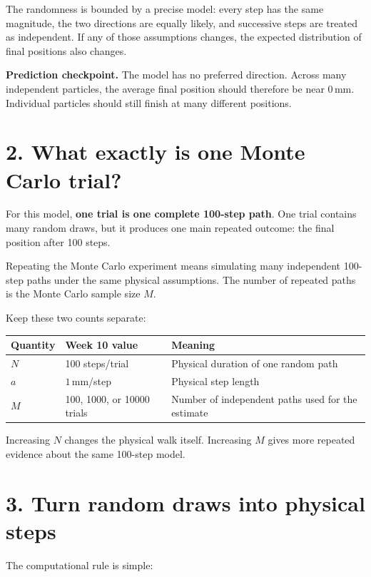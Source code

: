 \documentclass[11pt,a4paper]{article}
\newcommand{\units}[1]{\,\mathrm{#1}}
\begin{document}
The randomness is bounded by a precise model: every step has the same magnitude, the two directions are equally likely, and successive steps are treated as independent. If any of those assumptions changes, the expected distribution of final positions also changes.

\begin{checkbox}\textbf{Prediction checkpoint.} The model has no preferred direction. Across many independent particles, the average final position should therefore be near $0\units{mm}$. Individual particles should still finish at many different positions.\end{checkbox}

\section*{2. What exactly is one Monte Carlo trial?}
For this model, \textbf{one trial is one complete 100-step path}. One trial contains many random draws, but it produces one main repeated outcome: the final position after 100 steps.

Repeating the Monte Carlo experiment means simulating many independent 100-step paths under the same physical assumptions. The number of repeated paths is the Monte Carlo sample size $M$.

Keep these two counts separate:

\begin{center}\small
\begin{tabular}{p{.25\linewidth}p{.27\linewidth}p{.37\linewidth}}
\toprule
Quantity & Week 10 value & Meaning\\
\midrule
$N$ & 100 steps/trial & Physical duration of one random path\\
$a$ & $1\units{mm}$/step & Physical step length\\
$M$ & 100, 1000, or 10000 trials & Number of independent paths used for the estimate\\
\bottomrule
\end{tabular}
\end{center}

Increasing $N$ changes the physical walk itself. Increasing $M$ gives more repeated evidence about the same 100-step model.

\section*{3. Turn random draws into physical steps}
The computational rule is simple:
\end{document}
